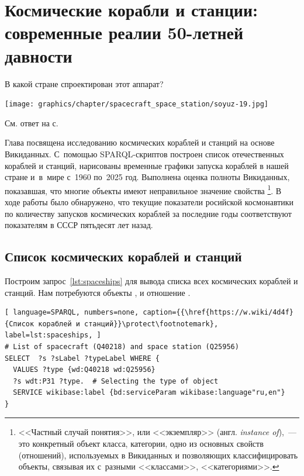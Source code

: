 \chapter{Космические корабли и станции: современные реалии 50-летней давности}
\label{ch:spacecraft-space-station}

\begin{marginfigure}[16\baselineskip]
    \MarginQuestion
    В какой стране спроектирован этот аппарат?

    \vspace{3pt}
	\texttt{[image: graphics/chapter/spacecraft\_space\_station/soyuz-19.jpg]}

    См. ответ %
    на с.~\pageref{answer:spacecraft_USSR}\\
    \label{question:spacecraft_soyuz19}
\end{marginfigure}

Глава посвящена исследованию космических кораблей и станций на основе Викиданных. 
С~помощью SPARQL-скриптов построен список отечественных кораблей и станций, 
нарисованы временные графики запуска кораблей в нашей стране и~в~мире с~1960 по~2025 год. 
Выполнена оценка полноты Викиданных, показавшая, 
что многие объекты имеют неправильное значение свойства \footnote{%
%
    <<Частный случай понятия>>, или <<экземпляр>> (англ. \emph{instance of}),~--- 
    это конкретный объект класса, категории, 
    одно из основных свойств (отношений), используемых в Викиданных и позволяющих классифицировать объекты, 
    связывая их с~разными <<классами>>, <<категориями>>.%
%
}. 
В ходе работы было обнаружено, что текущие показатели росийской космонавтики по количеству запусков космических кораблей за последние годы соответствуют показателям в СССР пятьдесят лет назад. 



\section{Список космических кораблей и станций}

Построим запрос~\ref{lst:spaceships} для вывода списка всех космических кораблей и станций. 
Нам потребуются объекты , 
 и отношение . 

\begin{lstlisting}[ language=SPARQL, numbers=none, caption={{\href{https://w.wiki/4d4f}{Список кораблей и станций}}\protect\footnotemark}, label=lst:spaceships, ]
# List of spacecraft (Q40218) and space station (Q25956)
SELECT  ?s ?sLabel ?typeLabel WHERE {
  VALUES ?type {wd:Q40218 wd:Q25956}
  ?s wdt:P31 ?type.  # Selecting the type of object
  SERVICE wikibase:label {bd:serviceParam wikibase:language"ru,en"}
}
\end{lstlisting}


